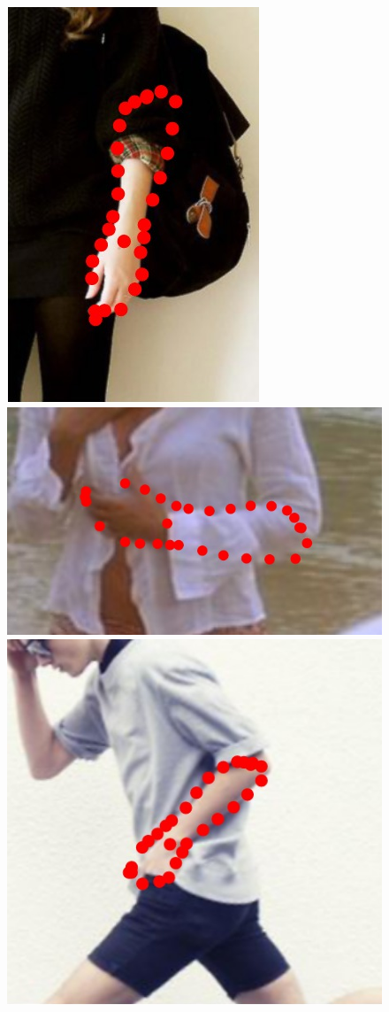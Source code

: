 \begin{figure}
    \includegraphics[height=\ofh]{resources/Annotation_Correction/Suplementory_Meterial/ExFit/0013}
    \hfill
    \includegraphics[height=\ofh]{resources/Annotation_Correction/Suplementory_Meterial/ExFit/0014}
    \hfill
    \includegraphics[height=\ofh]{resources/Annotation_Correction/Suplementory_Meterial/ExFit/0015}

\end{figure}

